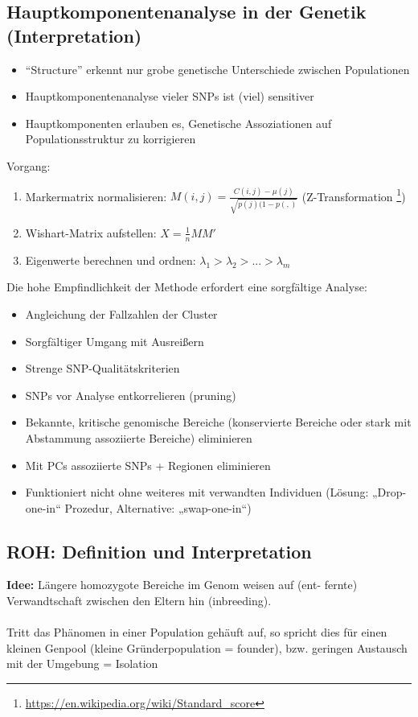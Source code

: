 \subsection{Hauptkomponentenanalyse in der Genetik (Interpretation)}
\begin{itemize}
	\item “Structure” erkennt nur grobe genetische Unterschiede zwischen Populationen
	\item Hauptkomponentenanalyse vieler SNPs ist (viel) sensitiver
	\item Hauptkomponenten erlauben es, Genetische Assoziationen auf Populationsstruktur zu korrigieren
\end{itemize}

Vorgang:
\begin{enumerate}
	\item Markermatrix normalisieren: $M(i,j)=\frac{C(i,j) - \mu(j)}{\sqrt{p(j)(1-p(,)}}$ (Z-Transformation \footnote{\url{https://en.wikipedia.org/wiki/Standard_score}})
	\item Wishart-Matrix aufstellen: $X=\frac{1}{n}MM'$
	\item Eigenwerte berechnen und ordnen: $\lambda_1 > \lambda_2 > ... > \lambda_m$
\end{enumerate}

Die hohe Empfindlichkeit der Methode erfordert eine sorgfältige Analyse:
\begin{itemize}
	\item Angleichung der Fallzahlen der Cluster
	\item Sorgfältiger Umgang mit Ausreißern
	\item Strenge SNP-Qualitätskriterien
	\item SNPs vor Analyse entkorrelieren (pruning)
	\item Bekannte, kritische genomische Bereiche (konservierte Bereiche oder stark mit Abstammung assoziierte Bereiche) eliminieren
	\item Mit PCs assoziierte SNPs + Regionen eliminieren
	\item Funktioniert nicht ohne weiteres mit verwandten Individuen (Lösung: „Drop-one-in“ Prozedur, Alternative: „swap-one-in“)
\end{itemize}

\newpage
\subsection{ROH: Definition und Interpretation}
\textbf{Idee:} Längere homozygote Bereiche im Genom weisen auf (ent-
fernte) Verwandtschaft zwischen den Eltern hin (inbreeding).
\\\\
Tritt das Phänomen in einer Population gehäuft auf, so spricht dies
für einen kleinen Genpool (kleine Gründerpopulation = founder),
bzw. geringen Austausch mit der Umgebung = Isolation\\

